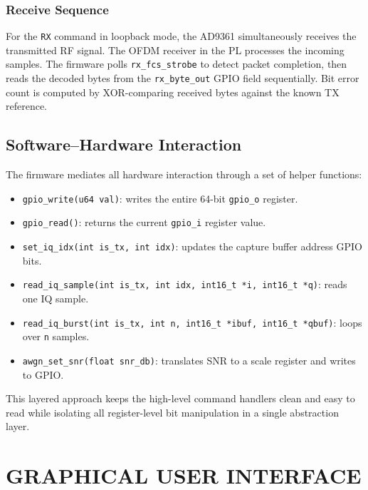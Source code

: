 \documentclass[12pt, a4paper, oneside]{report}
\begin{document}
\subsection{Receive Sequence}

For the \texttt{RX} command in loopback mode, the AD9361 simultaneously receives the transmitted RF signal. The OFDM receiver in the PL processes the incoming samples. The firmware polls \texttt{rx\_fcs\_strobe} to detect packet completion, then reads the decoded bytes from the \texttt{rx\_byte\_out} GPIO field sequentially. Bit error count is computed by XOR-comparing received bytes against the known TX reference.

\section{Software--Hardware Interaction}

The firmware mediates all hardware interaction through a set of helper functions:

\begin{itemize}[noitemsep]
  \item \texttt{gpio\_write(u64 val)}: writes the entire 64-bit \texttt{gpio\_o} register.
  \item \texttt{gpio\_read()}: returns the current \texttt{gpio\_i} register value.
  \item \texttt{set\_iq\_idx(int is\_tx, int idx)}: updates the capture buffer address GPIO bits.
  \item \texttt{read\_iq\_sample(int is\_tx, int idx, int16\_t *i, int16\_t *q)}: reads one IQ sample.
  \item \texttt{read\_iq\_burst(int is\_tx, int n, int16\_t *ibuf, int16\_t *qbuf)}: loops over \texttt{n} samples.
  \item \texttt{awgn\_set\_snr(float snr\_db)}: translates SNR to a scale register and writes to GPIO.
\end{itemize}

This layered approach keeps the high-level command handlers clean and easy to read while isolating all register-level bit manipulation in a single abstraction layer.

\chapter{GRAPHICAL USER INTERFACE}
\end{document}

